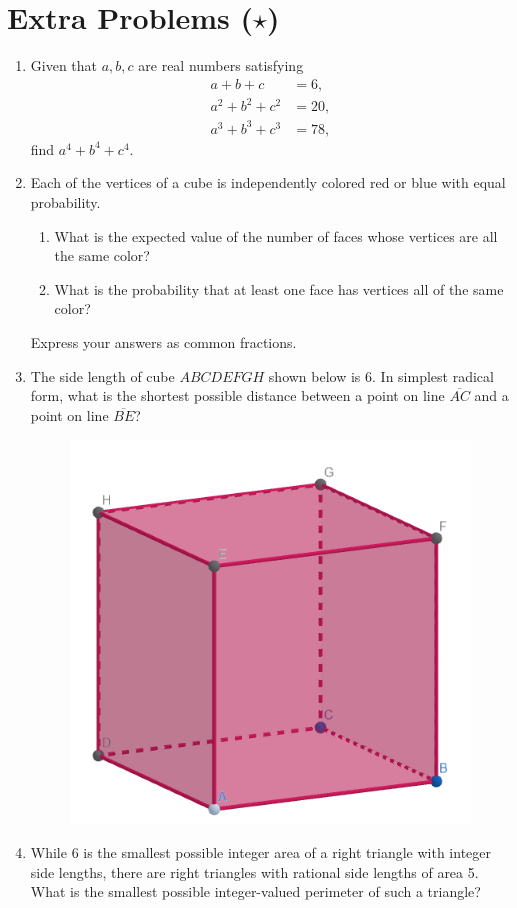 \documentclass{article}
\begin{document}
\newpage

\section*{Extra Problems ($\star$)}

\begin{enumerate}
\item Given that $a,b,c$ are real numbers satisfying
\begin{align*}
a + b + c &= 6, \\
a^2 + b^2 + c^2 &= 20, \\
a^3 + b^3 + c^3 &= 78,
\end{align*}
find $a^4 + b^4 + c^4$.
\vspace{2cm}
\item Each of the vertices of a cube is independently colored red or blue with equal probability.
\begin{enumerate}
\item What is the expected value of the number of faces whose vertices are all the same color?
\item What is the probability that at least one face has vertices all of the same color?
\end{enumerate}
Express your answers as common fractions.
\vspace{2cm}
\item The side length of cube $ABCDEFGH$ shown below is 6. In simplest radical form, what is the shortest possible distance between a point on line $\overline{AC}$ and a point on line $\overline{BE}$?
\begin{figure}[H]
\centering
\includegraphics[scale=0.5]{cube.png}
\end{figure}
\item While 6 is the smallest possible integer area of a right triangle with integer side lengths, there are right triangles with rational side lengths of area 5. What is the smallest possible integer-valued perimeter of such a triangle?
\end{enumerate}
\end{document}
